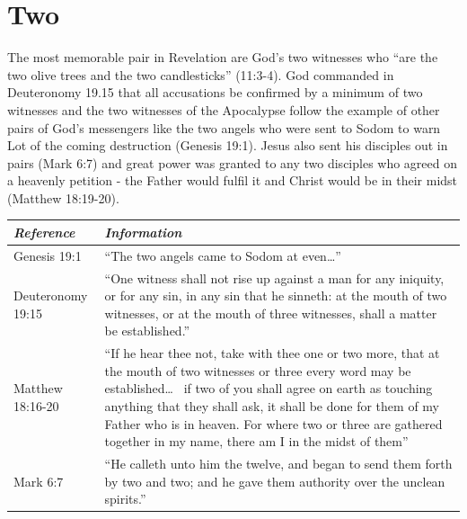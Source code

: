\section*{Two}
The most memorable pair in Revelation are God's two witnesses who ``are the two olive trees and the two candlesticks'' (11:3-4). God commanded in Deuteronomy 19.15 that all accusations be confirmed by a minimum of two witnesses and the two witnesses of the Apocalypse follow the example of other pairs of God's messengers like the two angels who were sent to Sodom to warn Lot of the coming destruction (Genesis 19:1). Jesus also sent his disciples out in pairs (Mark 6:7) and great power was granted to any two disciples who agreed on a heavenly petition - the Father would fulfil it and Christ would be in their midst (Matthew 18:19-20).  
\newline\newline
\begin{tabularx}{\textwidth}{l X}
\toprule
\rowcolor{headergray}\emph{Reference} & \emph{Information}\\ 
\midrule
Genesis 19:1 & ``The two angels came to Sodom at even\ldots'' \\
\addlinespace
Deuteronomy 19:15 & ``One witness shall not rise up against a man for any iniquity, or for any sin, in any sin that he sinneth: at the mouth of two witnesses, or at the mouth of three witnesses, shall a matter be established.'' \\
\addlinespace
Matthew 18:16-20 & ``If he hear thee not, take with thee one or two more, that at the mouth of two witnesses or three every word may be established\ldots~ if two of you shall agree on earth as touching anything that they shall ask, it shall be done for them of my Father who is in heaven. For where two or three are gathered together in my name, there am I in the midst of them'' \\
\addlinespace
Mark 6:7 & ``He calleth unto him the twelve, and began to send them forth by two and two; and he gave them authority over the unclean spirits.'' \\
\bottomrule
\end{tabularx}

